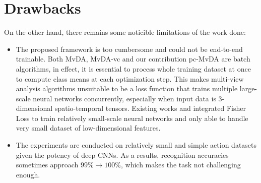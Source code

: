 
\section{Drawbacks} \label{sec:drawbacks}

    On the other hand, there remains some noticible limitations of the work done:
    \begin{itemize}
        \item The proposed framework is too cumbersome and could not be end-to-end trainable.
        Both MvDA, MvDA-vc and our contribution pc-MvDA are batch algorithms, in effect, it is essential to process whole training dataset at once to compute class means at each optimization step.
        This makes multi-view analysis algorithms unsuitable to be a loss function that trains multiple large-scale neural networks concurrently, especially when input data is 3-dimensional spatio-temporal tensors.
        Existing works \cite{kan2016multi} and \cite{cao2017generalized} integrated Fisher Loss to train relatively small-scale neural networks and only able to handle very small dataset of low-dimensional features.
        \item The experiments are conducted on relatively small and simple action datasets given the potency of deep CNNs.
        As a results, recognition accuracies sometimes approach $99\%\to100\%$, which makes the task not challenging enough.
    \end{itemize}
